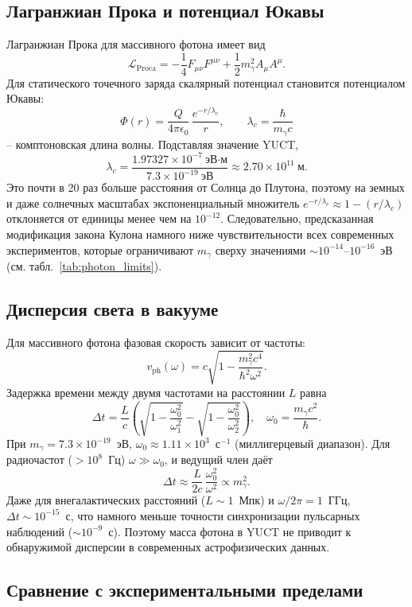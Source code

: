 \documentclass[11pt,a4paper]{article}
\begin{document}
	\subsection{Лагранжиан Прока и потенциал Юкавы}
	
	Лагранжиан Прока для массивного фотона имеет вид
	\[
	\mathcal{L}_{\text{Proca}} = -\frac14 F_{\mu\nu}F^{\mu\nu} + \frac12 m_\gamma^2 A_\mu A^\mu .
	\]
	Для статического точечного заряда скалярный потенциал становится потенциалом Юкавы:
	\[
	\Phi(r) = \frac{Q}{4\pi\epsilon_0}\,\frac{e^{-r/\lambda_c}}{r},
	\qquad
	\lambda_c = \frac{\hbar}{m_\gamma c}
	\]
	– комптоновская длина волны. Подставляя значение YUCT,
	\[
	\lambda_c = \frac{1.97327\times10^{-7}~\text{эВ·м}}{7.3\times10^{-19}~\text{эВ}}
	\approx 2.70\times10^{11}~\text{м}.
	\]
	Это почти в 20 раз больше расстояния от Солнца до Плутона, поэтому на земных и даже солнечных масштабах
	экспоненциальный множитель $e^{-r/\lambda_c}\approx 1 - (r/\lambda_c)$ отклоняется от единицы менее чем на $10^{-12}$.
	Следовательно, предсказанная модификация закона Кулона намного ниже чувствительности всех современных экспериментов,
	которые ограничивают $m_\gamma$ сверху значениями $\sim 10^{-14}$–$10^{-16}$~эВ (см. табл.~\ref{tab:photon_limits}).
	
	\subsection{Дисперсия света в вакууме}
	
	Для массивного фотона фазовая скорость зависит от частоты:
	\[
	v_{\text{ph}}(\omega) = c\sqrt{1 - \frac{m_\gamma^2 c^4}{\hbar^2\omega^2}} .
	\]
	Задержка времени между двумя частотами на расстоянии $L$ равна
	\[
	\Delta t = \frac{L}{c}\left( \sqrt{1-\frac{\omega_0^2}{\omega_1^2}} - \sqrt{1-\frac{\omega_0^2}{\omega_2^2}} \right),
	\quad \omega_0 = \frac{m_\gamma c^2}{\hbar}.
	\]
	При $m_\gamma = 7.3\times10^{-19}$~эВ, $\omega_0 \approx 1.11\times10^{3}$~с$^{-1}$ (миллигерцевый диапазон).
	Для радиочастот ($>10^8$~Гц) $\omega \gg \omega_0$, и ведущий член даёт
	\[
	\Delta t \approx \frac{L}{2c}\,\frac{\omega_0^2}{\omega^2} \propto m_\gamma^2.
	\]
	Даже для внегалактических расстояний ($L\sim 1$~Мпк) и $\omega/2\pi = 1$~ГГц, $\Delta t \sim 10^{-15}$~с,
	что намного меньше точности синхронизации пульсарных наблюдений ($\sim 10^{-9}$~с). Поэтому масса фотона
	в YUCT не приводит к обнаружимой дисперсии в современных астрофизических данных.
	
	\subsection{Сравнение с экспериментальными пределами}
	
\end{document}
